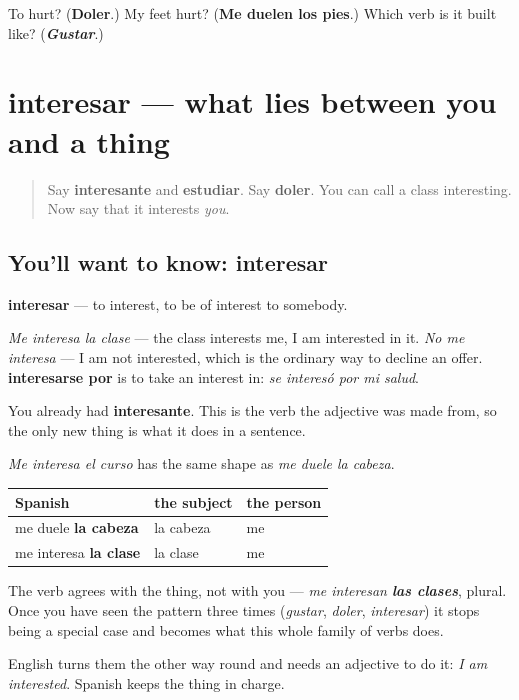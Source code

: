 \begin{tcolorbox}[breakable,colback=teal!4,colframe=teal!35!black,title={Before you move on}]
To hurt? (\textbf{Doler}.) My feet hurt? (\textbf{Me duelen los pies}.) Which verb is it built like? (\emph{\textbf{Gustar}}.)
\end{tcolorbox}
\section[interesar]{interesar — what lies between you and a thing}

\label{lesson:ES-C443-interesar}



\begin{quote}
Say \textbf{interesante} and \textbf{estudiar}. Say \textbf{doler}. You can call a class interesting. Now say that it interests \emph{you}.
\end{quote}

\subsection*{You'll want to know: interesar}
\textbf{interesar} — to interest, to be of interest to somebody.

\emph{Me interesa la clase} — the class interests me, I am interested in it. \emph{No me interesa} — I am not interested, which is the ordinary way to decline an offer. \textbf{interesarse por} is to take an interest in: \emph{se interesó por mi salud}.

You already had \textbf{interesante}. This is the verb the adjective was made from, so the only new thing is what it does in a sentence.

\begin{grammarlens}[title={Grammar Lens: the same machine again}]
\emph{Me interesa el curso} has the same shape as \emph{me duele la cabeza}.

\noindent
\begin{tabularx}{\linewidth}{@{}>{\raggedright\arraybackslash}X>{\raggedright\arraybackslash}X>{\raggedright\arraybackslash}X@{}}
\toprule
\textbf{Spanish} & \textbf{the subject} & \textbf{the person} \\
\midrule
me duele \textbf{la cabeza} & la cabeza & me \\
me interesa \textbf{la clase} & la clase & me \\
\bottomrule
\end{tabularx}

The verb agrees with the thing, not with you — \emph{me interesan \textbf{las clases}}, plural. Once you have seen the pattern three times (\emph{gustar}, \emph{doler}, \emph{interesar}) it stops being a special case and becomes what this whole family of verbs does.

English turns them the other way round and needs an adjective to do it: \emph{I am interested}. Spanish keeps the thing in charge.
\end{grammarlens}

